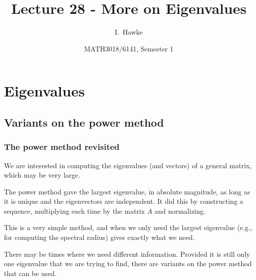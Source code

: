 \documentclass{beamer}
\title[Lecture 28] %
{Lecture 28 - More on Eigenvalues}
\author[I. Hawke] %
{I.~Hawke}
\institute[University of Southampton] %
{
  School of Mathematics, \\
  University of Southampton, UK
}
\date[Semester 1] %
{MATH3018/6141, Semester 1}
\begin{document}
\begin{frame}
  \titlepage
\end{frame}








\section{Eigenvalues}

\subsection{Variants on the power method}

\begin{frame}
  \frametitle{The power method revisited}

  We are interested in computing the eigenvalues (and vectors) of a
  general matrix, which may be very large. \pause

  \vspace{1ex}

  The power method gave the largest eigenvalue, in absolute magnitude,
  as long as it is unique and the eigenvectors are independent. It did
  this by constructing a sequence, multiplying each time by the matrix
  $A$ and normalizing. \pause

  \vspace{1ex}

  This is a very simple method, and when we only need the largest
  eigenvalue (e.g., for computing the spectral radius) gives exactly
  what we need. \pause

  \vspace{1ex}

  There may be times where we need different information. Provided it
  is still only one eigenvalue that we are trying to find, there are
  variants on the power method that can be used.

\end{frame}
\end{document}
